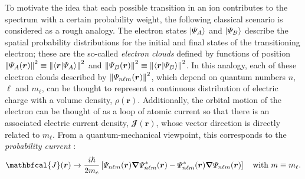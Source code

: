 To motivate the idea that each possible transition in an ion contributes to the spectrum with a certain probability weight, the following classical scenario is considered as a rough analogy. 
The electron states $\ket{\Psi_A}$ and $\ket{\Psi_B}$ describe the spatial probability distributions for the initial and final states of the transitioning electron; these are the so-called \emph{electron clouds} defined by functions of position $\norm{\Psi_A (\mathbold{r})}^2 \equiv \norm{\braket{\mathbold{r}}{\Psi_A}}^2$ and $\norm{\Psi_B (\mathbold{r})}^2 \equiv \norm{\braket{\mathbold{r}}{\Psi_B}}^2$. 
In this analogy, each of these electron clouds described by $\norm{\Psi_{n \ell m} (\mathbold{r})}^2$, which depend on quantum numbers $n$, $\ell$ and $m_{\ell}$, can be thought to represent a continuous distribution of electric charge with a volume density, $\rho(\mathbold{r})$. 
Additionally, the orbital motion of the electron can be thought of as a loop of atomic current so that there is an associated electric current density, $\mathbfcal{J} (\mathbold{r})$, whose vector direction is directly related to $m_{\ell}$. 
From a quantum-mechanical viewpoint, this corresponds to the \emph{probability current} \cite{Griffiths05}:
\begin{equation}
 \mathbfcal{J} (\mathbold{r}) \to \frac{i \hbar}{2 m_e} \left[ \Psi_{n \ell m} (\mathbold{r}) \grad \Psi_{n \ell m}^* (\mathbold{r}) - \Psi_{n \ell m}^* (\mathbold{r}) \grad \Psi_{n \ell m} (\mathbold{r}) \right] \quad \text{with } m \equiv m_{\ell} .
 \end{equation}


